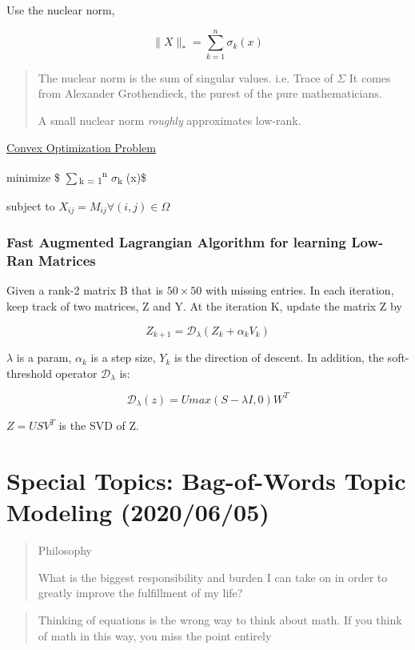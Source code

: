 \documentclass[11pt]{article}
\begin{document}
Use the nuclear norm,

$$
\|X\|_* = \sum_{k = 1}^{n} \sigma_k (x)
$$

\begin{quote}
The nuclear norm is the sum of singular values. i.e. Trace of \(\Sigma\) It comes from Alexander
Grothendieck, the purest of the pure mathematicians.

A small nuclear norm \emph{roughly} approximates low-rank.
\end{quote}

\uline{Convex Optimization Problem}

minimize \$ \(\sum\)\textsubscript{k = 1}\textsuperscript{n} \(\sigma\)\textsubscript{k} (x)\$

subject to \(X_{ij} = M_{ij} \forall (i,j) \in \Omega\)

\subsubsection{Fast Augmented Lagrangian Algorithm for learning Low-Ran Matrices}
\label{sec:org5cef695}

Given a rank-2 matrix B that is \(50 \times 50\) with missing entries. In each
iteration, keep track of two matrices, Z and Y. At the iteration K, update the
matrix Z by

$$
Z_{k + 1} = \mathcal D_{\lambda} (Z_k + \alpha_k V_k)
$$

\(\lambda\) is a param, \(\alpha_k\) is a step size, \(Y_k\) is the direction of
descent. In addition, the soft-threshold operator \(\mathcal D_{\lambda}\) is:

$$
\mathcal D_{\lambda} (z) = U max(S - \lambda I, 0) W^T
$$

\(Z = U S V^T\) is the SVD of Z.
\section{Special Topics: Bag-of-Words Topic Modeling (2020/06/05)}
\label{sec:org83ae965}

\begin{quote}
Philosophy

What is the biggest responsibility and burden I can take on in order to greatly
improve the fulfillment of my life?
\end{quote}

\begin{quote}
Thinking of equations is the wrong way to think about math. If you think of math
in this way, you miss the point entirely
\end{quote}
\end{document}
